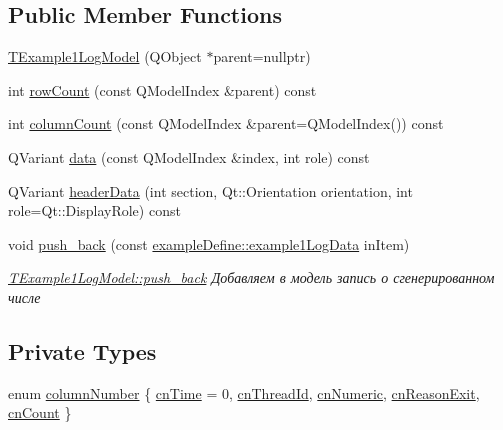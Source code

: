 \subsection*{Public Member Functions}
\begin{DoxyCompactItemize}
\item 
\hyperlink{class_t_example1_log_model_a683a810bee1b3bac7175d320978aa915}{T\+Example1\+Log\+Model} (Q\+Object $\ast$parent=nullptr)
\item 
int \hyperlink{class_t_example1_log_model_a878b1dde0fbca43a40dbec1ea5e3109c}{row\+Count} (const Q\+Model\+Index \&parent) const
\item 
int \hyperlink{class_t_example1_log_model_aac991c4c9946cc0aaf8bf19284730418}{column\+Count} (const Q\+Model\+Index \&parent=Q\+Model\+Index()) const
\item 
Q\+Variant \hyperlink{class_t_example1_log_model_af60e29db85fceba45bc87abbc70cb322}{data} (const Q\+Model\+Index \&index, int role) const
\item 
Q\+Variant \hyperlink{class_t_example1_log_model_adb2eb0cb6da284368ee357e6e737c48c}{header\+Data} (int section, Qt\+::\+Orientation orientation, int role=Qt\+::\+Display\+Role) const
\item 
void \hyperlink{class_t_example1_log_model_ac65587677b307f28f624491de852177a}{push\+\_\+back} (const \hyperlink{structexample_define_1_1example1_log_data}{example\+Define\+::example1\+Log\+Data} in\+Item)
\begin{DoxyCompactList}\small\item\em \hyperlink{class_t_example1_log_model_ac65587677b307f28f624491de852177a}{T\+Example1\+Log\+Model\+::push\+\_\+back} Добавляем в модель запись о сгенерированном числе \end{DoxyCompactList}\end{DoxyCompactItemize}
\subsection*{Private Types}
\begin{DoxyCompactItemize}
\item 
enum \hyperlink{class_t_example1_log_model_a35176287f620f85dcd35feb1f2bf138d}{column\+Number} \{ \newline
\hyperlink{class_t_example1_log_model_a35176287f620f85dcd35feb1f2bf138da30a664ca598280d4d89c903fc50693ee}{cn\+Time} = 0, 
\hyperlink{class_t_example1_log_model_a35176287f620f85dcd35feb1f2bf138da27aaa5f508929e02d97434e5e7cd1093}{cn\+Thread\+Id}, 
\hyperlink{class_t_example1_log_model_a35176287f620f85dcd35feb1f2bf138daf24ceb67117dd9665cd42939a24b3f71}{cn\+Numeric}, 
\hyperlink{class_t_example1_log_model_a35176287f620f85dcd35feb1f2bf138da9785852fcff74e0cbf608d31d0591db0}{cn\+Reason\+Exit}, 
\newline
\hyperlink{class_t_example1_log_model_a35176287f620f85dcd35feb1f2bf138dac45cba205e366952a3811663f52fa2fa}{cn\+Count}
 \}
\end{DoxyCompactItemize}
